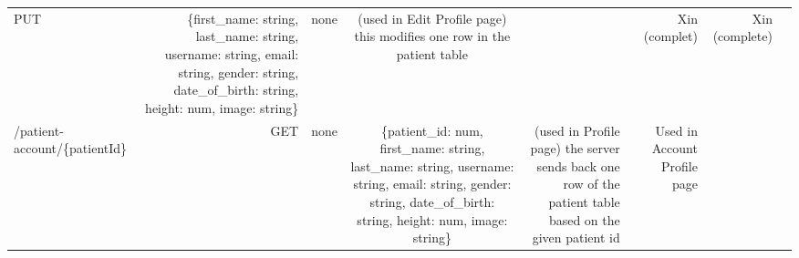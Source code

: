\documentclass[]{book}
\begin{document}
\begin{longtable}[]{@{}lrrcrrrr@{}}
\begin{minipage}[t]{0.13\columnwidth}
PUT\strut
\end{minipage} & \begin{minipage}[t]{0.13\columnwidth}\raggedleft\strut
\{first\_name: string, last\_name: string, username: string, email:
string, gender: string, date\_of\_birth: string, height: num, image:
string\}\strut
\end{minipage} & \begin{minipage}[t]{0.14\columnwidth}\centering\strut
none\strut
\end{minipage} & \begin{minipage}[t]{0.06\columnwidth}\raggedleft\strut
(used in Edit Profile page) this modifies one row in the patient
table\strut
\end{minipage} & \begin{minipage}[t]{0.06\columnwidth}\raggedleft\strut
\strut
\end{minipage} & \begin{minipage}[t]{0.06\columnwidth}\raggedleft\strut
Xin (complet)\strut
\end{minipage} & \begin{minipage}[t]{0.06\columnwidth}\raggedleft\strut
Xin (complete)\strut
\end{minipage}\tabularnewline
\begin{minipage}[t]{0.12\columnwidth}\raggedright\strut
/patient-account/\{patientId\}\strut
\end{minipage} & \begin{minipage}[t]{0.13\columnwidth}\raggedleft\strut
GET\strut
\end{minipage} & \begin{minipage}[t]{0.13\columnwidth}\raggedleft\strut
none\strut
\end{minipage} & \begin{minipage}[t]{0.14\columnwidth}\centering\strut
\{patient\_id: num, first\_name: string, last\_name: string, username:
string, email: string, gender: string, date\_of\_birth: string, height:
num, image: string\}\strut
\end{minipage} & \begin{minipage}[t]{0.06\columnwidth}\raggedleft\strut
(used in Profile page) the server sends back one row of the patient
table based on the given patient id\strut
\end{minipage} & \begin{minipage}[t]{0.06\columnwidth}\raggedleft\strut
Used in Account Profile page\strut
\end{minipage} & \begin{minipage}[t]{0.06\columnwidth}\raggedleft\strut

\end{minipage}
\end{longtable}
\end{document}
